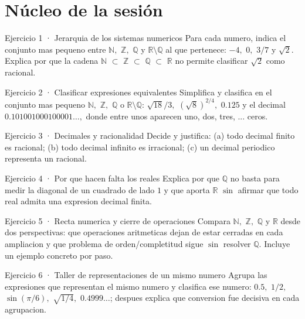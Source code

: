 \documentclass[10pt,a4paper,oneside,openany]{book}
\begin{document}
\section*{Núcleo de la sesión}
\begin{PSevenExerciseFixed}{Ejercicio 1 · Jerarquia de los sistemas numericos}
Para cada numero, indica el conjunto mas pequeno entre \(\mathbb{N},\) \(\mathbb{Z},\) \(\mathbb{Q}\) y \(\mathbb{R}\setminus \mathbb{Q}\) al que pertenece: \(-4,\) \(0,\) \(3/7\) y \(\sqrt{2}\). Explica por que la cadena \(\mathbb{N}\) \(\subset \) \(\mathbb{Z}\) \(\subset \) \(\mathbb{Q}\) \(\subset \) \(\mathbb{R}\) no permite clasificar \(\sqrt{2}\) como racional.
\end{PSevenExerciseFixed}
\begin{PSevenExerciseFixed}{Ejercicio 2 · Clasificar expresiones equivalentes}
Simplifica y clasifica en el conjunto mas pequeno \(\mathbb{N},\) \(\mathbb{Z},\) \(\mathbb{Q}\) o \(\mathbb{R}\setminus \mathbb{Q}\): \(\sqrt{18}/3,\) \((\sqrt{8})^{2/4},\) \(0.125\) y el decimal \(0.101001000100001\ldots ,\) donde entre unos aparecen uno, dos, tres, ... ceros.
\end{PSevenExerciseFixed}
\begin{PSevenExerciseFixed}{Ejercicio 3 · Decimales y racionalidad}
Decide y justifica: (a) todo decimal finito es racional; (b) todo decimal infinito es irracional; (c) un decimal periodico representa un racional.
\end{PSevenExerciseFixed}
\begin{PSevenExerciseFixed}{Ejercicio 4 · Por que hacen falta los reales}
Explica por que \(\mathbb{Q}\) no basta para medir la diagonal de un cuadrado de lado \(1\) y que aporta \(\mathbb{R}\) \(\sin\) afirmar que todo real admita una expresion decimal finita.
\end{PSevenExerciseFixed}
\begin{PSevenExerciseFixed}{Ejercicio 5 · Recta numerica y cierre de operaciones}
Compara \(\mathbb{N},\) \(\mathbb{Z},\) \(\mathbb{Q}\) y \(\mathbb{R}\) desde dos perspectivas: que operaciones aritmeticas dejan de estar cerradas en cada ampliacion y que problema de orden/completitud sigue \(\sin\) resolver \(\mathbb{Q}\). Incluye un ejemplo concreto por paso.
\end{PSevenExerciseFixed}
\begin{PSevenExerciseFixed}{Ejercicio 6 · Taller de representaciones de un mismo numero}
Agrupa las expresiones que representan el mismo numero y clasifica ese numero: \(0.5,\) \(1/2,\) \(\sin(\pi /6),\) \(\sqrt{1/4},\) \(0.4999\ldots \); despues explica que conversion fue decisiva en cada agrupacion.
\end{PSevenExerciseFixed}
\end{document}
